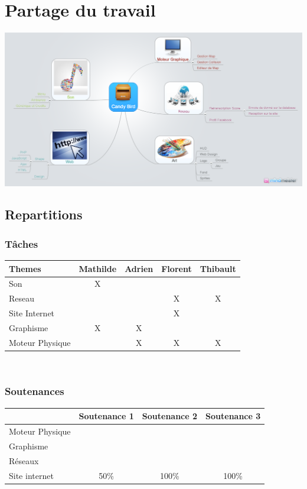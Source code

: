 \documentclass [11pt]{report}
\begin{document}
\chapter {Partage du travail}
\begin{center}
\includegraphics[scale=0.3]{images/Candy_Bird.png}
\end{center}

\newpage 

	\section{Repartitions}
		\subsection{Tâches}
			\begin{tabular}{| l |*{4} {c|}}
				\hline
				Themes & Mathilde & Adrien & Florent & Thibault \\
				\hline
				Son & X & & & \\
				\hline
				Reseau & & & X & X \\
				\hline
				Site Internet & & & X & \\
				\hline
				Graphisme & X & X & & \\
				\hline
				Moteur Physique & & X & X & X\\
				\hline
			\end{tabular}\\\vspace{5mm}


		\subsection{Soutenances}
			\begin{tabular}{| l | * {3}{c|}}
				\hline
		 		& Soutenance 1 & Soutenance 2 & Soutenance 3 \\
				\hline
				Moteur Physique & & & \\
				\hline
				 Graphisme & & & \\
				\hline
				Réseaux & & & \\
				\hline
				Site internet & 50\% & 100\%  & 100\%  \\
	          			 \hline
			\end{tabular}\\\vspace{10mm}
\end{document}
